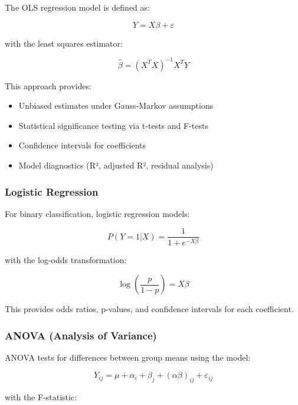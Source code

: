 \documentclass[11pt,a4paper]{article}
\begin{document}
The OLS regression model is defined as:

\begin{equation}
Y = X\beta + \varepsilon
\end{equation}

with the least squares estimator:

\begin{equation}
\hat{\beta} = (X^T X)^{-1} X^T Y
\end{equation}

This approach provides:
\begin{itemize}
    \item Unbiased estimates under Gauss-Markov assumptions
    \item Statistical significance testing via t-tests and F-tests
    \item Confidence intervals for coefficients
    \item Model diagnostics (R², adjusted R², residual analysis)
\end{itemize}

\subsubsection{Logistic Regression}

For binary classification, logistic regression models:

\begin{equation}
P(Y=1|X) = \frac{1}{1 + e^{-X\beta}}
\end{equation}

with the log-odds transformation:

\begin{equation}
\log\left(\frac{p}{1-p}\right) = X\beta
\end{equation}

This provides odds ratios, p-values, and confidence intervals for each coefficient.

\subsubsection{ANOVA (Analysis of Variance)}

ANOVA tests for differences between group means using the model:

\begin{equation}
Y_{ij} = \mu + \alpha_i + \beta_j + (\alpha\beta)_{ij} + \varepsilon_{ij}
\end{equation}

with the F-statistic:
\end{document}
